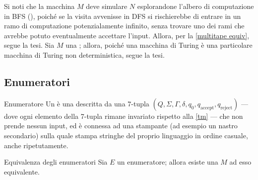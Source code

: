\documentclass[a4paper, 12pt]{report}
\begin{document}
{        Si noti che la macchina $M$ deve simulare $N$ esplorandone l'albero di computazione in BFS (), poiché se la visita avvenisse in DFS si rischierebbe di entrare in un ramo di computazione potenzialamente infinito, senza trovare uno dei rami che avrebbe potuto eventualmente accettare l'input. Allora, per la \cref{multitape equiv}, segue la tesi.
    }{
        Sia $M$ una \TM; allora, poiché una macchina di Turing è una particolare macchina di Turing non deterministica, segue la tesi.
    }

    \subsection{Enumeratori}

    \begin{frameddefn}{Enumeratore}
        Un  è una \TM descritta da una 7-tupla $(Q, \Sigma, \Gamma, \delta, q_0, q_\mathrm{accept}, q_\mathrm{reject})$ --- dove ogni elemento della 7-tupla rimane invariato rispetto alla \cref{tm} --- che non prende nessun input, ed è connessa ad una stampante (ad esempio un nastro secondario) sulla quale stampa stringhe del proprio linguaggio in ordine casuale, anche ripetutamente.
    \end{frameddefn}

    \begin{framedprop}{Equivalenza degli enumeratori}
        Sia $E$ un enumeratore; allora esiste una \TM $M$ ad esso equivalente.
    \end{framedprop}
\end{document}
